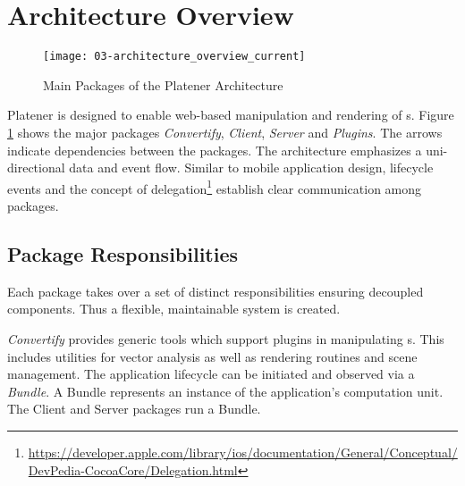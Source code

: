 \documentclass[../ClassicThesis.tex]{subfiles}
\begin{document}
\section{Architecture Overview}

\begin{figure}
  \texttt{[image: 03-architecture\_overview\_current]}
  \caption{Main Packages of the Platener Architecture}
  \label{fig:architectureOverviewCurrent}
\end{figure}

Platener is designed to enable web-based manipulation and rendering of
{\threedmodel}s. Figure \ref{fig:architectureOverviewCurrent} shows the major
packages \emph{Convertify}, \emph{Client}, \emph{Server} and \emph{Plugins}. The
arrows indicate dependencies between the packages. The architecture emphasizes a
uni-directional data and event flow. Similar to mobile application design,
lifecycle events and the concept of
delegation\footnote{\url{https://developer.apple.com/library/ios/documentation/General/Conceptual/DevPedia-CocoaCore/Delegation.html}}
establish clear communication among packages.


\subsection{Package Responsibilities}

Each package takes over a set of distinct responsibilities ensuring decoupled
components. Thus a flexible, maintainable system is created.

\emph{Convertify} provides generic tools which support plugins in manipulating
{\threedmodel}s. This includes utilities for vector analysis as well as
rendering routines and scene management. The application lifecycle can be
initiated and observed via a \emph{Bundle}. A Bundle represents an instance of
the application's computation unit. The Client and Server packages run a Bundle.
\end{document}
